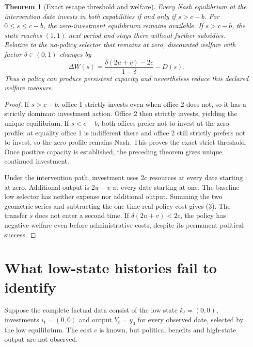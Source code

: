 \documentclass[11pt,a4paper]{article}
\newtheorem{theorem}{Theorem}[section]
\theoremstyle{definition}
\theoremstyle{remark}
\begin{document}
\begin{theorem}[Exact escape threshold and welfare]
Every Nash equilibrium at the intervention date invests in both capabilities if and only if $s>c-b$. For $0\leq s\leq c-b$, the zero-investment equilibrium remains available. If $s>c-b$, the state reaches $(1,1)$ next period and stays there without further subsidies. Relative to the no-policy selector that remains at zero, discounted welfare with factor $\delta\in(0,1)$ changes by
\[
 \Delta W(s)=\frac{\delta(2u+v)-2c}{1-\delta}-D(s).\tag{3}
\]
Thus a policy can produce persistent capacity and nevertheless reduce this declared welfare measure.
\end{theorem}
\begin{proof}
If $s>c-b$, office 1 strictly invests even when office 2 does not, so it has a strictly dominant investment action. Office 2 then strictly invests, yielding the unique equilibrium. If $s<c-b$, both offices prefer not to invest at the zero profile; at equality office 1 is indifferent there and office 2 still strictly prefers not to invest, so the zero profile remains Nash. This proves the exact strict threshold. Once positive capacity is established, the preceding theorem gives unique continued investment.

Under the intervention path, investment uses $2c$ resources at every date starting at zero. Additional output is $2u+v$ at every date starting at one. The baseline low selector has neither expense nor additional output. Summing the two geometric series and subtracting the one-time real policy cost gives (3). The transfer $s$ does not enter a second time. If $\delta(2u+v)<2c$, the policy has negative welfare even before administrative costs, despite its permanent political success.
\end{proof}

\section{What low-state histories fail to identify}
Suppose the complete factual data consist of the low state $k_t=(0,0)$, investments $i_t=(0,0)$ and output $Y_t=y_0$ for every observed date, selected by the low equilibrium. The cost $c$ is known, but political benefits and high-state output are not observed.
\end{document}
